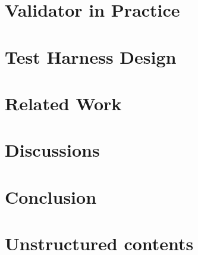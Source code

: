 \documentclass[12pt,oneside]{amsbook}
\theoremstyle{definition}
\numberwithin{section}{chapter}
\numberwithin{figure}{chapter}
\numberwithin{equation}{chapter}
\numberwithin{definition}{chapter}
\begin{document}
\chapter{Validator in Practice}
\label{chap:practices}


\chapter{Test Harness Design}
\label{chap:harness}

\chapter{Related Work}
\label{chap:related-work}


\chapter{Discussions}
\label{chap:discussion}

\chapter{Conclusion}
\label{chap:conclusion}

\printbibliography

\appendix

\chapter{Unstructured contents}

\end{document}
